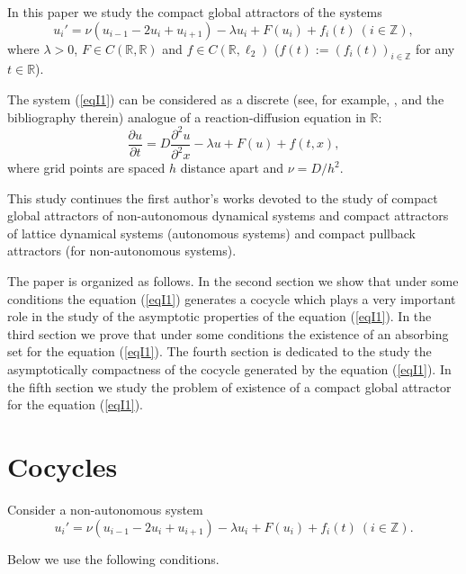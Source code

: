 \documentclass{amsart}%
\begin{document}
In this paper we study the compact global attractors of the
systems
\begin{equation}\label{eqI1}
u_{i}'=\nu (u_{i-1}-2u_i+u_{i+1})-\lambda u_{i}+F(u_i)+f_{i}(t)\
(i\in \mathbb Z),
\end{equation}
where $\lambda >0$, $F\in C(\mathbb R, \mathbb R)$ and $f\in
C(\mathbb R,\ell_{2})$ ($f(t):=(f_{i}(t))_{i\in \mathbb Z}$ for
any $t\in \mathbb R$).

The system (\ref{eqI1}) can be considered as a discrete (see, for
example, \cite{BLW_2001}, \cite{HK_2023} and the bibliography
therein) analogue of a reaction-diffusion equation in $\mathbb R$:
\begin{equation}\label{eqI1.1}
 \frac{\partial{u}}{\partial{t}} = D\frac{\partial^{2}{u}}{\partial^{2}{x}}-\lambda u + F(u) +
 f(t,x),\nonumber
\end{equation}
where grid points are spaced $h$ distance apart and $\nu =
D/h^{2}$.

This study continues the first author's works devoted to the study
of compact global attractors of non-autonomous dynamical systems
\cite{Che_2015} and compact attractors of lattice dynamical
systems \cite{BLW_2001} (autonomous systems) and compact pullback
attractors \cite{HK_2023} (for non-autonomous systems).

The paper is organized as follows. In the second section we show
that under some conditions the equation (\ref{eqI1}) generates a
cocycle which plays a very important role in the study of the
asymptotic properties of the equation (\ref{eqI1}). In the third
section we prove that under some conditions the existence of an
absorbing set for the equation (\ref{eqI1}). The fourth section is
dedicated to the study the asymptotically compactness of the
cocycle generated by the equation (\ref{eqI1}). In the fifth
section we study the problem of existence of a compact global
attractor for the equation (\ref{eqI1}).


\section{Cocycles}\label{Sec2}

Consider a non-autonomous system
\begin{equation}\label{eq2.1}
u_{i}'=\nu (u_{i-1}-2u_i+u_{i+1})-\lambda u_{i}+F(u_i)+f_{i}(t)\
(i\in \mathbb Z) .
\end{equation}

Below we use the following conditions.
\end{document}
